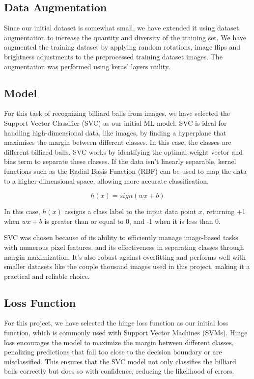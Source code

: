 \documentclass{article}
\begin{document}
\subsection{Data Augmentation}
\label{sec:data_augmentation}
Since our initial dataset is somewhat small, we have extended it using dataset augmentation to increase the quantity 
and diversity of the training set. We have augmented the training dataset by applying random rotations, 
image flips and brightness adjustments to the preprocessed training dataset images. The augmentation was performed using keras' layers utility.

\subsection{Model}
\label{sec:model}
For this task of recognizing billiard balls from images, we have selected the Support Vector Classifier (SVC) as our initial ML model. 
SVC is ideal for handling high-dimensional data, like images, by finding a hyperplane that maximises the margin between different classes. In this case, 
the classes are different billiard balls. SVC works by identifying the optimal weight vector and bias term to separate these classes. If the data isn't 
linearly separable, kernel functions such as the Radial Basis Function (RBF) can be used to map the data to a higher-dimensional space, allowing more 
accurate classification. \cite{unknownMachineLearningApproach2023, nobleWhatSupportVector2006}

\begin{equation}
    h(x)=sign(wx+b)
\end{equation}

In this case, $h(x)$ assigns a class label  to the input data point $x$, returning +1 when $wx+b$ is greater than or equal to 0, and -1 
when it is less than 0.

SVC was chosen because of its ability to efficiently manage image-based tasks with numerous pixel features, and its effectiveness in separating 
classes through margin maximization. It's also robust against overfitting and performs well with smaller datasets like the couple thousand images 
used in this project, making it a practical and reliable choice. \cite{unknownMachineLearningApproach2023, nobleWhatSupportVector2006}

\subsection{Loss Function}
\label{sec:loss_function}
For this project, we have selected the hinge loss function as our initial loss function, which is commonly used with Support Vector Machines (SVMs). 
Hinge loss encourages the model to maximize the margin between different classes, penalizing predictions that fall too close to the decision boundary 
or are misclassified. This ensures that the SVC model not only classifies the billiard balls correctly but does so with confidence, 
reducing the likelihood of errors. \cite{unknownMachineLearningApproach2023, bartlettClassificationRejectOption2008}
\end{document}
